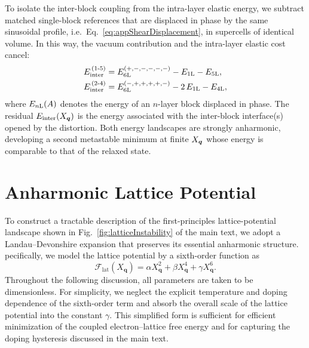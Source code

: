 \documentclass[aps,prx,article,twocolumn,amsmath,amssymb,superscriptaddress,longbibliography]{revtex4-2}
\begin{document}
To isolate the inter-block coupling from the intra-layer elastic energy, we subtract matched single-block references that are displaced in phase by the same sinusoidal profile, i.e.~Eq.~\eqref{eq:appShearDisplacement}, in supercells of identical volume. In this way, the vacuum contribution and the intra-layer elastic cost cancel:
\begin{align}
E_{\rm inter}^{\,(1\text{-}5)} &= E_{6\rm L}^{(+,-,-,-,-,-)} - E_{1\rm L} - E_{5\rm L},\\
E_{\rm inter}^{\,(2\text{-}4)} &= E_{6\rm L}^{(-,+,+,+,+,-)} - 2\,E_{1\rm L} - E_{4\rm L},
\end{align}
where $E_{n\rm L}(A)$ denotes the energy of an $n$-layer block displaced in phase. The residual $E_{\rm inter}(X_{\vb*{q}})$ is the energy associated with the inter-block interface(s) opened by the distortion. Both energy landscapes are strongly anharmonic, developing a second metastable minimum at finite $X_{\vb*{q}}$ whose energy is comparable to that of the relaxed state. 

\section{Anharmonic Lattice Potential}\label{app:latticePotential}

To construct a tractable description of the first-principles lattice-potential landscape shown in Fig.~\ref{fig:latticeInstability} of the main text, we adopt a Landau--Devonshire expansion that preserves its essential anharmonic structure. pecifically, we model the lattice potential by a sixth-order function as
\begin{equation}\label{eq:appLatticePotential}
\mathcal F_{\mathrm{lat}}(X_{\mathbf q}) = \alpha X_{\mathbf q}^2 + \beta  X_{\mathbf q}^4 + \gamma X_{\mathbf q}^6 .
\end{equation}
Throughout the following discussion, all parameters are taken to be dimensionless. For simplicity, we neglect the explicit temperature and doping dependence of the sixth-order term and absorb the overall scale of the lattice potential into the constant $\gamma$. This simplified form is sufficient for efficient minimization of the coupled electron--lattice free energy and for capturing the doping hysteresis discussed in the main text.
\end{document}

